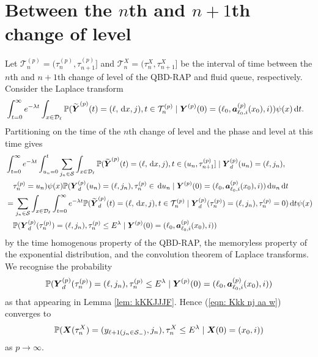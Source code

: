 \section{Between the \(n\)th and \(n+1\)th change of level}\label{sec: between n and np1}
Let \(\mathcal T_n^{(p)} = (\tau_{n}^{(p)},\tau_{n+1}^{(p)}]\) and \(\mathcal T_n^X=(\tau_n^X,\tau_{n+1}^X]\) be the interval of time between the \(n\)th and \(n+1\)th change of level of the QBD-RAP and fluid queue, respectively. Consider the Laplace transform 
\begin{align}
	\nonumber&\int_{t=0}^\infty e^{-\lambda t}\int_{x\in\mathcal{D}_\ell}\mathbb P(\widetilde{\boldsymbol Y}^{(p)}(t) = (\ell, \, \mathrm{d} x, j), t\in\mathcal T_n^{(p)} \mid 
	\boldsymbol Y^{(p)}(0)=(\ell_0, \boldsymbol a_{\ell_0,i}^{(p)}(x_0), i))\psi(x)\, \mathrm{d} t.
\end{align}
Partitioning on the time of the \(n\)th change of level and the phase and level at this time gives
\begin{align}
	&\int_{t=0}^\infty e^{-\lambda t} \int_{u_n=0}^t\sum_{j_n\in\mathcal S}
	\int_{x\in\mathcal{D}_\ell}\mathbb P(\widetilde{\boldsymbol Y}^{(p)}(t) = (\ell,\, \mathrm{d} x,j), 
	t \in(u_n, \tau_{n+1}^{(p)}] \mid\boldsymbol Y_d^{(p)}(u_n) = (\ell,j_n), \nonumber
	\\&\quad \tau_{n}^{(p)}= u_n)\psi(x) \mathbb P(\boldsymbol Y_d^{(p)}(u_n) = (\ell, j_n), \tau_{n}^{(p)}\in \, \mathrm{d} u_n 
	 \mid \boldsymbol Y^{(p)}(0)=(\ell_0, \boldsymbol  a_{\ell_0,i}^{(p)}(x_0), i)) 
	 \, \mathrm{d} u_n\, \mathrm{d} t \nonumber 
	 \\&= \sum_{j_n\in\mathcal S}
	\int_{x\in\mathcal{D}_\ell} \int_{t=0}^\infty e^{-\lambda t} \mathbb P(\widetilde{\boldsymbol Y}_d^{(p)}(t) = (\ell,\, \mathrm{d} x, j), 
	t\in\mathcal T_n^{(p)} \mid\nonumber 
	  \boldsymbol Y_d^{(p)}(\tau_n^{(p)}) = (\ell,j_n), 
	  \tau_{n}^{(p)}= 0)\, \mathrm{d} t \psi(x)  
	  \\&\quad{} \mathbb P(\boldsymbol Y_d^{(p)}(\tau_n^{(p)}) = (\ell,j_n), \tau_{n}^{(p)}\leq E^\lambda 
	 \mid \boldsymbol Y^{(p)}(0)=(\ell_0, \boldsymbol  a_{\ell_0,i}^{(p)}(x_0), i)) \label{eqn: l whkrqvlkjbrd}
\end{align}
by the time homogenous property of the QBD-RAP, the memoryless property of the exponential distribution, and the convolution theorem of Laplace transforms. We recognise the probability 
\begin{align}
	\mathbb P(\boldsymbol Y_d^{(p)}(\tau_n^{(p)}) = (\ell, j_n), \tau_{n}^{(p)}\leq E^\lambda 
	 \mid \boldsymbol Y^{(p)}(0)=(\ell_0, \boldsymbol  a_{\ell_0,i}^{(p)}(x_0), i)) \label{eqn: Kkk nj aa w}
\end{align}
as that appearing in Lemma \ref{lem: kKKJJJF}. Hence (\ref{eqn: Kkk nj aa w}) converges to 
\begin{align}
	\mathbb P(\boldsymbol X(\tau_n^X) = (y_{\ell+1(j_{n}\in\mathcal S_-)}, 
		j_n), \tau_{n}^X\leq E^\lambda
		\mid \boldsymbol X(0)=(x_0, i)) \label{eqn: ashverkjbvjhkhdsknacva}
\end{align}
as \(p\to\infty\). 

